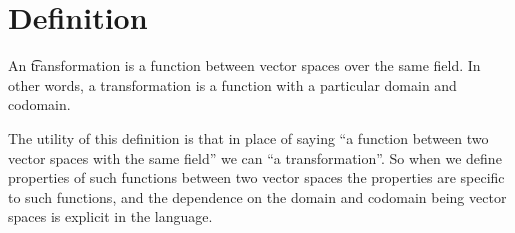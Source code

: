 

\section*{Definition}

An \t{transformation} is a function between vector spaces over the same field.
In other words, a transformation is a function with a particular domain and codomain.

The utility of this definition is that in place of saying ``a function between two vector spaces with the same field'' we can ``a transformation''.
So when we define properties of such functions between two vector spaces the properties are specific to such functions, and the dependence on the domain and codomain being vector spaces is explicit in the language.

\blankpage